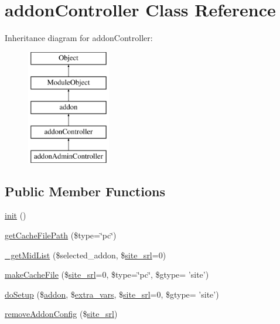 \hypertarget{classaddonController}{\section{addon\-Controller Class Reference}
\label{classaddonController}
}
Inheritance diagram for addon\-Controller\-:\begin{figure}[H]
\begin{center}
\leavevmode
\includegraphics[height=5.000000cm]{classaddonController}
\end{center}
\end{figure}
\subsection*{Public Member Functions}
\begin{DoxyCompactItemize}
\item 
\hyperlink{classaddonController_a11ede7aecba420c2a5c7e55d8bab4013}{init} ()
\item 
\hyperlink{classaddonController_aaad3343ec8471cab540db6ebde4c06bd}{get\-Cache\-File\-Path} (\$type=\char`\"{}pc\char`\"{})
\item 
\hyperlink{classaddonController_a7a1ed742a1dd2c4f71e56acafe31c13d}{\-\_\-get\-Mid\-List} (\$selected\-\_\-addon, \$\hyperlink{ko_8install_8php_a8b1406b4ad1048041558dce6bfe89004}{site\-\_\-srl}=0)
\item 
\hyperlink{classaddonController_ad0f567db4f461bb5d2d6449b38f261ed}{make\-Cache\-File} (\$\hyperlink{ko_8install_8php_a8b1406b4ad1048041558dce6bfe89004}{site\-\_\-srl}=0, \$type=\char`\"{}pc\char`\"{}, \$gtype= 'site')
\item 
\hyperlink{classaddonController_a029f47b2dc77ada00e12e6323039ebdb}{do\-Setup} (\$\hyperlink{classaddon}{addon}, \$\hyperlink{ko_8install_8php_ae1dcb37fc34a8f312d2e6abd6f806743}{extra\-\_\-vars}, \$\hyperlink{ko_8install_8php_a8b1406b4ad1048041558dce6bfe89004}{site\-\_\-srl}=0, \$gtype= 'site')
\item 
\hyperlink{classaddonController_ad90c76bfd8351152d3d69b287c606fe5}{remove\-Addon\-Config} (\$\hyperlink{ko_8install_8php_a8b1406b4ad1048041558dce6bfe89004}{site\-\_\-srl})
\end{DoxyCompactItemize}
